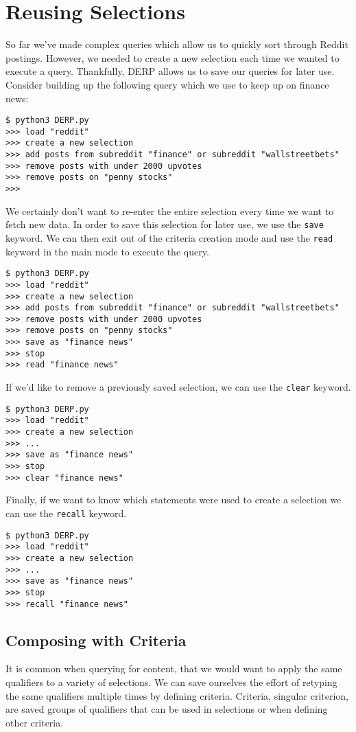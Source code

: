 \section{Reusing Selections}
So far we’ve made complex queries which allow us to quickly sort through Reddit postings.
However, we needed to create a new selection each time we wanted to execute a query.
Thankfully, DERP allows us to save our queries for later use. Consider building up the
following query which we use to keep up on finance news:
\begin{lstlisting}
$ python3 DERP.py
>>> load "reddit"
>>> create a new selection
>>> add posts from subreddit "finance" or subreddit "wallstreetbets"
>>> remove posts with under 2000 upvotes
>>> remove posts on "penny stocks"
>>>
\end{lstlisting}
We certainly don’t want to re-enter the entire selection every time we want to fetch new data.
In order to save this selection for later use, we use the \texttt{save} keyword. We can then exit out of 
the criteria creation mode and use the \texttt{read} keyword in the main mode to execute the query.
\begin{lstlisting}
$ python3 DERP.py
>>> load "reddit"
>>> create a new selection
>>> add posts from subreddit "finance" or subreddit "wallstreetbets"
>>> remove posts with under 2000 upvotes
>>> remove posts on "penny stocks"
>>> save as "finance news"
>>> stop
>>> read "finance news"
\end{lstlisting}
If we’d like to remove a previously saved selection, we can use the \texttt{clear} keyword.
\begin{lstlisting}
$ python3 DERP.py
>>> load "reddit"
>>> create a new selection
>>> ...
>>> save as "finance news"
>>> stop
>>> clear "finance news"
\end{lstlisting}
Finally, if we want to know which statements were used to create a selection we can use the \texttt{recall} keyword.
\begin{lstlisting}
$ python3 DERP.py
>>> load "reddit"
>>> create a new selection
>>> ...
>>> save as "finance news"
>>> stop
>>> recall "finance news"
\end{lstlisting}
\subsection{Composing with Criteria}
It is common when querying for content, that we would want to apply the same qualifiers to a
variety of selections. We can save ourselves the effort of retyping the same qualifiers multiple
times by defining criteria. Criteria, singular criterion, are saved groups of qualifiers that
can be used in selections or when defining other criteria.


